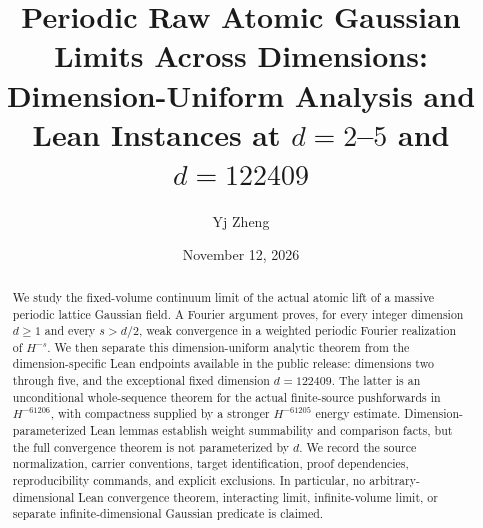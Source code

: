 \documentclass[11pt]{amsart}
\title[Periodic raw Gaussian limits across dimensions]{Periodic Raw Atomic Gaussian Limits Across Dimensions:\\Dimension-Uniform Analysis and Lean Instances at $d=2$--$5$ and $d=122409$}
\author{Yj Zheng}
\date{November 12, 2026}
\theoremstyle{remark}\newtheorem{remark}[theorem]{Remark}
\begin{document}
\begin{abstract}
We study the fixed-volume continuum limit of the actual atomic lift of a massive periodic lattice Gaussian field. A Fourier argument proves, for every integer dimension $d\geq1$ and every $s>d/2$, weak convergence in a weighted periodic Fourier realization of $H^{-s}$. We then separate this dimension-uniform analytic theorem from the dimension-specific Lean endpoints available in the public release: dimensions two through five, and the exceptional fixed dimension $d=122409$. The latter is an unconditional whole-sequence theorem for the actual finite-source pushforwards in $H^{-61206}$, with compactness supplied by a stronger $H^{-61205}$ energy estimate. Dimension-parameterized Lean lemmas establish weight summability and comparison facts, but the full convergence theorem is not parameterized by $d$. We record the source normalization, carrier conventions, target identification, proof dependencies, reproducibility commands, and explicit exclusions. In particular, no arbitrary-dimensional Lean convergence theorem, interacting limit, infinite-volume limit, or separate infinite-dimensional Gaussian predicate is claimed.
\end{abstract}
\maketitle
\tableofcontents





\appendix


\end{document}
